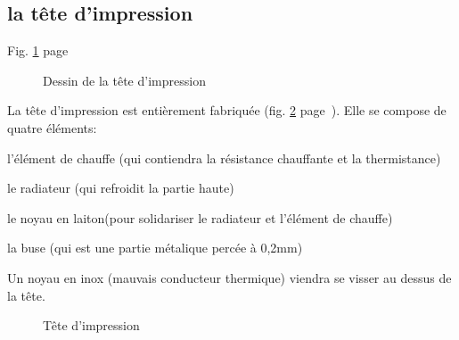 \subsection{la tête d'impression}
\noindent Fig. \ref{sch_tete} page~\pageref{sch_tete} \par %
\begin{figure}%
   \caption{\label{sch_tete} Dessin de la tête d'impression}%
\end{figure}%
La tête d'impression est entièrement fabriquée (fig. \ref{tete_impression} %
page~\pageref{tete_impression}). Elle se compose de quatre éléments:%
\begin{dinglist}{71}%
\item{l'élément de chauffe (qui contiendra la résistance chauffante et la thermistance)}%
\item{le radiateur (qui refroidit la partie haute)}%
\item{le noyau en laiton(pour solidariser le radiateur et l'élément de chauffe)}%
\item{la buse (qui est une partie métalique percée à 0,2mm)}%
\end{dinglist}%
Un noyau en inox (mauvais conducteur thermique) viendra se visser au dessus de la tête.
\begin{figure}%
   \caption{\label{tete_impression} Tête d'impression}%
\end{figure}%
